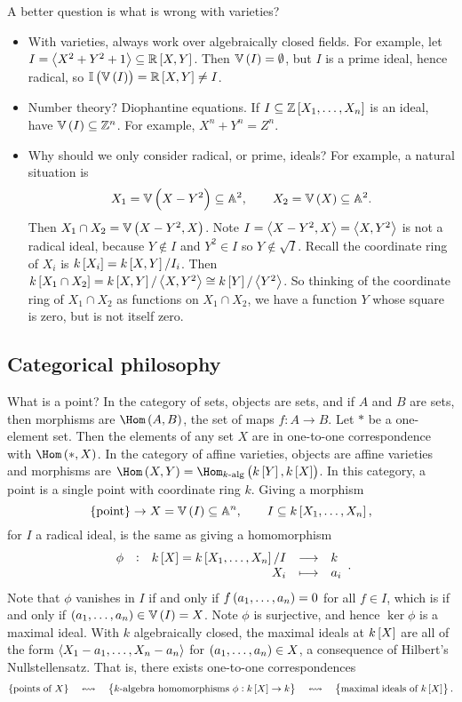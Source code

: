 A better question is what is wrong with varieties?
\begin{itemize}
\item With varieties, always work over algebraically closed fields. For example, let $ I = \abr{X^2 + Y^2 + 1} \subseteq \RR\sbr{X, Y} $. Then $ \VV\br{I} = \emptyset $, but $ I $ is a prime ideal, hence radical, so $ \II\br{\VV\br{I}} = \RR\sbr{X, Y} \ne I $.
\item Number theory? Diophantine equations. If $ I \subseteq \ZZ\sbr{X_1, \dots, X_n} $ is an ideal, have $ \VV\br{I} \subseteq \ZZ^n $. For example, $ X^n + Y^n = Z^n $.
\item Why should we only consider radical, or prime, ideals? For example, a natural situation is
$$ X_1 = \VV\br{X - Y^2} \subseteq \AA^2, \qquad X_2 = \VV\br{X} \subseteq \AA^2. $$
Then $ X_1 \cap X_2 = \VV\br{X - Y^2, X} $. Note $ I = \left\langle X - Y^2, X \right\rangle = \left\langle X, Y^2 \right\rangle $ is not a radical ideal, because $ Y \notin I $ and $ Y^2 \in I $ so $ Y \not\in \sqrt{I} $. Recall the coordinate ring of $ X_i $ is $ k\sbr{X_i} = k\sbr{X, Y} / I_i $. Then $ k\sbr{X_1 \cap X_2} = k\sbr{X, Y} / \abr{X, Y^2} \cong k\sbr{Y} / \abr{Y^2} $. So thinking of the coordinate ring of $ X_1 \cap X_2 $ as functions on $ X_1 \cap X_2 $, we have a function $ Y $ whose square is zero, but is not itself zero.
\end{itemize}

\pagebreak

\subsection{Categorical philosophy}

What is a point? In the category of sets, objects are sets, and if $ A $ and $ B $ are sets, then morphisms are $ \Hom\br{A, B} $, the set of maps $ f : A \to B $. Let $ * $ be a one-element set. Then the elements of any set $ X $ are in one-to-one correspondence with $ \Hom\br{*, X} $. In the category of affine varieties, objects are affine varieties and morphisms are $ \Hom\br{X, Y} = \Hom_{\text{$ k $-alg}}\br{k\sbr{Y}, k\sbr{X}} $. In this category, a point is a single point with coordinate ring $ k $. Giving a morphism
$$ \cbr{\text{point}} \to X = \VV\br{I} \subseteq \AA^n, \qquad I \subseteq k\sbr{X_1, \dots, X_n}, $$
for $ I $ a radical ideal, is the same as giving a homomorphism
$$ \function[\phi]{k\sbr{X} = k\sbr{X_1, \dots, X_n} / I}{k}{X_i}{a_i}. $$
Note that $ \phi $ vanishes in $ I $ if and only if $ f\br{a_1, \dots, a_n} = 0 $ for all $ f \in I $, which is if and only if $ \br{a_1, \dots, a_n} \in \VV\br{I} = X $. Note $ \phi $ is surjective, and hence $ \ker \phi $ is a maximal ideal. With $ k $ algebraically closed, the maximal ideals at $ k\sbr{X} $ are all of the form $ \left\langle X_1 - a_1, \dots, X_n - a_n \right\rangle $ for $ \br{a_1, \dots, a_n} \in X $, a consequence of Hilbert's Nullstellensatz. That is, there exists one-to-one correspondences
$$ \cbr{\text{points of} \ X} \quad \leftrightsquigarrow \quad \cbr{\text{$ k $-algebra homomorphisms} \ \phi : k\sbr{X} \to k} \quad \leftrightsquigarrow \quad \cbr{\text{maximal ideals of} \ k\sbr{X}}. $$

